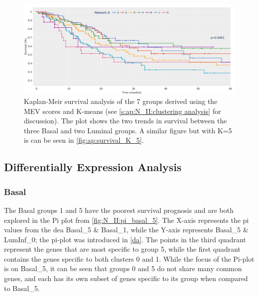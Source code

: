 \begin{figure}[!htb]    
    \centering
    \includegraphics[width=1.0\textwidth,height=1.0\textheight,keepaspectratio]{Sections/Network_II/resources/reward/cluster_analysis/survival_K_7.png}
    \caption{Kaplan-Meir survival analysis of the 7 groups derived using the MEV scores and K-means (see \ref{s:ap:N_II:clustering analysis} for discussion). The plot shows the two trends in survival between the three Basal and two Luminal groups. A similar figure but with K=5 is can be seen in \cref{fig:ap:survival_K_5}. }
    \label{fig:N_II:survival_K_7}
\end{figure}


\subsection{Differentially Expression Analysis}

\subsubsection*{Basal} \label{s:N_II:basak}

The Basal groups 1 and 5 have the poorest survival prognosis and are both explored in the Pi plot from \cref{fig:N_II:pi_basal_5}. The X-axis represents the pi values from the \acrfull{dea} Basal\_5 \& Basal\_1, while the Y-axis represents Basal\_5 \& LumInf\_0; the pi-plot was introduced in \ref{da}. The points in the third quadrant represent the genes that are most specific to group 5, while the first quadrant contains the genes specific to both clusters 0 and 1. While the focus of the Pi-plot is on Basal\_5, it can be seen that groups 0 and 5 do not share many common genes, and each has its own subset of genes specific to its group when compared to Basal\_5.

